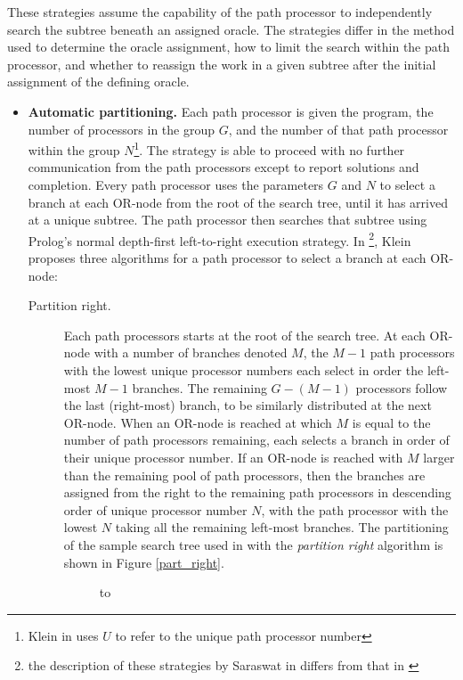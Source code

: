These strategies assume the capability of the path processor to independently search the
subtree beneath an assigned oracle.  The strategies differ in the method used to
determine the oracle assignment, how to limit the search within the path processor, and
whether to reassign the work in a given subtree after the initial assignment of the
defining oracle.
\begin{itemize}
\item{\textbf{Automatic partitioning.}
  Each path processor is given the program, the number of processors in the group $G$,
  and the number of that path processor within the group $N$\footnote{Klein in \cite{Kle91}
  uses $U$ to refer to the unique path processor number}.  The strategy is able to
  proceed with no further communication from the path processors except to report
  solutions and completion.
  Every path processor uses the parameters $G$ and $N$ to select a branch at each
  OR-node from the root of the search tree, until it has arrived at a unique
  subtree.  The path processor then searches that subtree using Prolog's normal
  depth-first left-to-right execution strategy.  In \cite{Kle91}\footnote{the
  description of these strategies by Saraswat in \cite{Sar95} differs from that in
  \cite{Kle91}}, Klein proposes three algorithms for a path processor to select 
  a branch at each OR-node:
  \begin{description}
  \item[Partition right.]{ Each path processors starts at the root of the search tree.  At
    each OR-node with a number of branches denoted $M$, the $M-1$ path processors with the
    lowest unique processor numbers each select in order the left-most $M-1$ branches.  The
    remaining \mbox{$G-(M-1)$} processors follow the last
    (right-most)  branch, to be similarly distributed at
    the next OR-node.  When an OR-node is reached at which $M$ is equal to the number
    of path processors remaining, each selects a branch in order of their unique processor
    number.  If an OR-node is reached with $M$ larger than the remaining pool of path
    processors, then the branches are assigned from the right to the remaining path
    processors in descending order of unique processor number $N$, with the path processor
    with the lowest $N$ taking all the remaining left-most branches.  The partitioning of
    the sample search tree used in \cite{Kle91} with the \textit{partition right}
    algorithm is shown in Figure \ref{part_right}.
\begin{figure}[h]
\vspace{5mm} \hbox to 

\end{figure}}
\end{description}}
\end{itemize}
